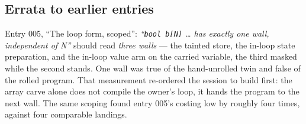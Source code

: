 \subsection*{Errata to earlier entries}
Entry 005, ``The loop form, scoped'': \emph{``\texttt{bool b[N]} \ldots{} has exactly one wall, independent of
N''} should read \emph{three walls} --- the tainted store, the in-loop state preparation, and the in-loop
value arm on the carried variable, the third masked while the second stands. One wall was true of the hand-unrolled twin and
false of the rolled program. That measurement re-ordered the session to build  first: the array
carve alone does not compile the owner's loop, it hands the program to the next wall. The same scoping found
entry 005's costing low by roughly four times, against four comparable landings.
